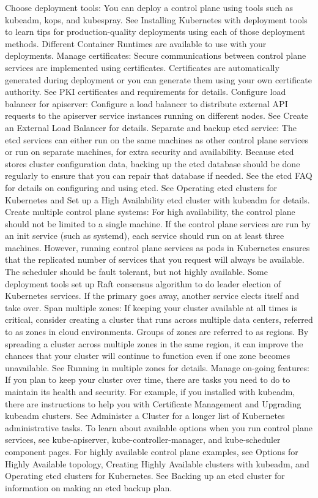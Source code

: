 Choose deployment tools: You can deploy a control plane using tools such as kubeadm, kops, and kubespray. See Installing Kubernetes with deployment tools to learn tips for production-quality deployments using each of those deployment methods. Different Container Runtimes are available to use with your deployments.
Manage certificates: Secure communications between control plane services are implemented using certificates. Certificates are automatically generated during deployment or you can generate them using your own certificate authority. See PKI certificates and requirements for details.
Configure load balancer for apiserver: Configure a load balancer to distribute external API requests to the apiserver service instances running on different nodes. See Create an External Load Balancer for details.
Separate and backup etcd service: The etcd services can either run on the same machines as other control plane services or run on separate machines, for extra security and availability. Because etcd stores cluster configuration data, backing up the etcd database should be done regularly to ensure that you can repair that database if needed. See the etcd FAQ for details on configuring and using etcd. See Operating etcd clusters for Kubernetes and Set up a High Availability etcd cluster with kubeadm for details.
Create multiple control plane systems: For high availability, the control plane should not be limited to a single machine. If the control plane services are run by an init service (such as systemd), each service should run on at least three machines. However, running control plane services as pods in Kubernetes ensures that the replicated number of services that you request will always be available. The scheduler should be fault tolerant, but not highly available. Some deployment tools set up Raft consensus algorithm to do leader election of Kubernetes services. If the primary goes away, another service elects itself and take over.
Span multiple zones: If keeping your cluster available at all times is critical, consider creating a cluster that runs across multiple data centers, referred to as zones in cloud environments. Groups of zones are referred to as regions. By spreading a cluster across multiple zones in the same region, it can improve the chances that your cluster will continue to function even if one zone becomes unavailable. See Running in multiple zones for details.
Manage on-going features: If you plan to keep your cluster over time, there are tasks you need to do to maintain its health and security. For example, if you installed with kubeadm, there are instructions to help you with Certificate Management and Upgrading kubeadm clusters. See Administer a Cluster for a longer list of Kubernetes administrative tasks.
To learn about available options when you run control plane services, see kube-apiserver, kube-controller-manager, and kube-scheduler component pages. For highly available control plane examples, see Options for Highly Available topology, Creating Highly Available clusters with kubeadm, and Operating etcd clusters for Kubernetes. See Backing up an etcd cluster for information on making an etcd backup plan.

